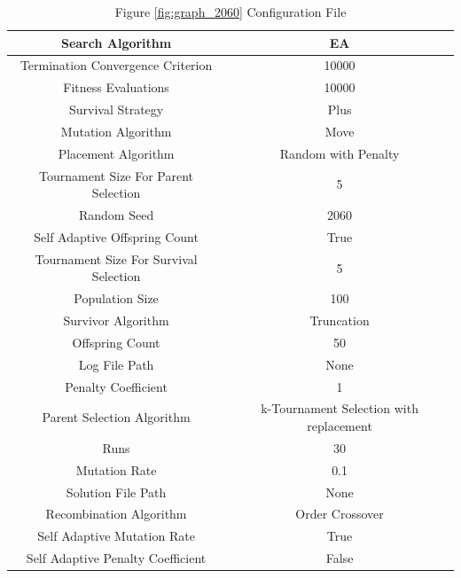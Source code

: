 \documentclass{standalone}
\begin{document}
\begin{table}[!htb]
	\centering
	\caption{Figure \ref{fig:graph_2060} Configuration File}
	\label{tab:graph_2060}
	\begin{tabular}{| c | c |}
		\hline
		Search Algorithm		& EA		 \\
		\hline
		Termination Convergence Criterion		& 10000		 \\
		\hline
		Fitness Evaluations		& 10000		 \\
		\hline
		Survival Strategy		& Plus		 \\
		\hline
		Mutation Algorithm		& Move		 \\
		\hline
		Placement Algorithm		& Random with Penalty		 \\
		\hline
		Tournament Size For Parent Selection		& 5		 \\
		\hline
		Random Seed		& 2060		 \\
		\hline
		Self Adaptive Offspring Count		& True		 \\
		\hline
		Tournament Size For Survival Selection		& 5		 \\
		\hline
		Population Size		& 100		 \\
		\hline
		Survivor Algorithm		& Truncation		 \\
		\hline
		Offspring Count		& 50		 \\
		\hline
		Log File Path		& None		 \\
		\hline
		Penalty Coefficient		& 1		 \\
		\hline
		Parent Selection Algorithm		& k-Tournament Selection with replacement		 \\
		\hline
		Runs		& 30		 \\
		\hline
		Mutation Rate		& 0.1		 \\
		\hline
		Solution File Path		& None		 \\
		\hline
		Recombination Algorithm		& Order Crossover		 \\
		\hline
		Self Adaptive Mutation Rate		& True		 \\
		\hline
		Self Adaptive Penalty Coefficient		& False		 \\
		\hline
	\end{tabular}
\end{table}
\end{document}
